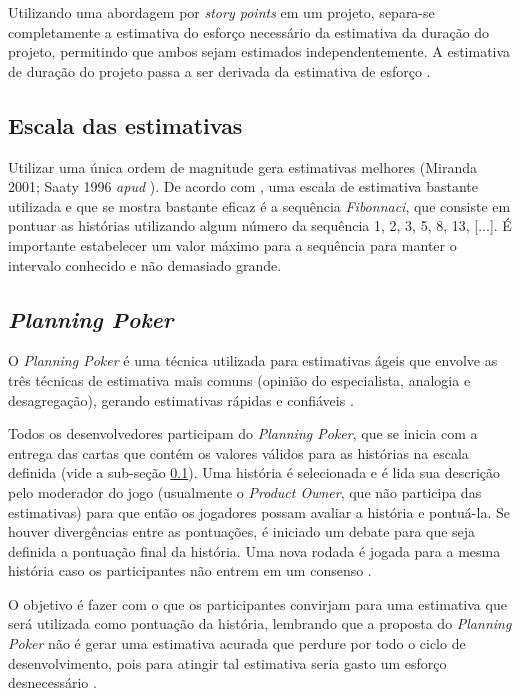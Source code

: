     Utilizando uma abordagem por \textit{story points} em um projeto, separa-se completamente a estimativa do esforço
    necessário da estimativa da duração do projeto, permitindo que ambos sejam estimados independentemente. A estimativa de
    duração do projeto passa a ser derivada da estimativa de esforço \cite{cohn06}.

  \subsection{Escala das estimativas}
  \label{estimation_scales}

      Utilizar uma única ordem de magnitude gera estimativas melhores (Miranda 2001; Saaty 1996 \textit{apud} \cite{cohn06}).
      De acordo com , uma escala de estimativa bastante utilizada e que se mostra bastante eficaz é a
      sequência \textit{Fibonnaci}, que consiste em pontuar as histórias utilizando algum número da
      sequência 1, 2, 3, 5, 8, 13, [...]. É importante estabelecer um valor máximo para a sequência para manter o intervalo
      conhecido e não demasiado grande.

  \subsection{\textit{Planning Poker}}

    O \textit{Planning Poker} é uma técnica utilizada para estimativas ágeis que envolve as três técnicas de estimativa
    mais comuns (opinião do especialista, analogia e desagregação), gerando estimativas rápidas e confiáveis \cite{cohn06}.

    Todos os desenvolvedores participam do \textit{Planning Poker}, que se inicia com a entrega das cartas que contém os
    valores válidos para as histórias na escala definida (vide a sub-seção \ref{estimation_scales}).
    Uma história é selecionada e é lida sua descrição pelo moderador
    do jogo (usualmente o \textit{Product Owner}, que não participa das estimativas) para que então os jogadores possam
    avaliar a história e pontuá-la. Se houver divergências entre as pontuações, é iniciado um debate para que seja definida
    a pontuação final da história. Uma nova rodada é jogada para a mesma história caso os participantes não
    entrem em um consenso \cite{grenning02}.

    O objetivo é fazer com o que os participantes convirjam para uma estimativa que será utilizada como pontuação da
    história, lembrando que a proposta do \textit{Planning Poker} não é gerar uma estimativa acurada que perdure por
    todo o ciclo de desenvolvimento, pois para atingir tal estimativa seria gasto um esforço
    desnecessário \cite{cohn06} \cite{grenning02}.

